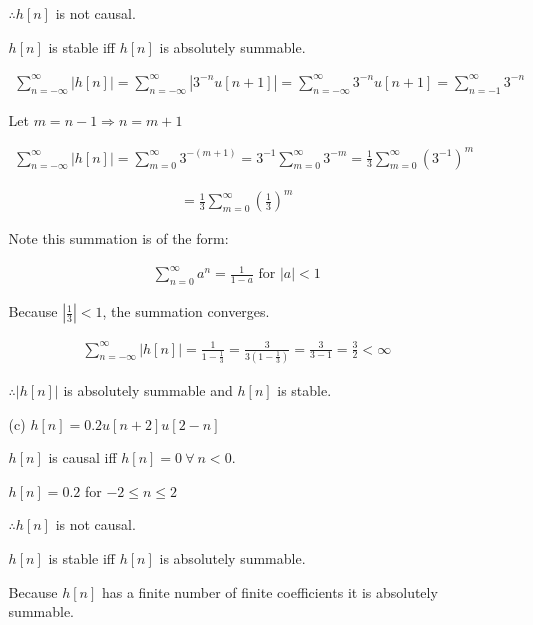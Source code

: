 \documentclass[fleqn]{article}
\begin{document}
\begin{enumerate}[nolistsep]
\begin{enumerate}[nolistsep]
					$\therefore h[n]$ is not causal.
					
					$h[n]$ is stable iff $h[n]$ is absolutely summable.
					
					\begin{align*}
						\sum_{n=-\infty}^{\infty}{|h[n]|} = \sum_{n=-\infty}^{\infty}{|3^{-n}u[n+1]|} = \sum_{n=-\infty}^{\infty}{3^{-n}u[n+1]} = \sum_{n=-1}^{\infty}{3^{-n}}
					\end{align*}
					
					Let $m = n - 1 \Rightarrow n = m + 1$
					
					\begin{align*}
						\sum_{n=-\infty}^{\infty}{|h[n]|} = \sum_{m=0}^{\infty}{3^{-(m+1)}} = 3^{-1}\sum_{m=0}^{\infty}{3^{-m}} = \frac{1}{3}\sum_{m=0}^{\infty}{(3^{-1})^{m}}
					\end{align*}
					
					\begin{align*}
						 = \frac{1}{3}\sum_{m=0}^{\infty}{\left(\frac{1}{3}\right)^{m}}
					\end{align*}
					
					Note this summation is of the form:
					
					\begin{align*}
						\sum_{n=0}^{\infty}{a^n} = \frac{1}{1-a} \text{ for } |a| < 1 
					\end{align*}
					
					Because $|\frac{1}{3}| < 1$, the summation converges.
					
					\begin{align*}
						\sum_{n=-\infty}^{\infty}{|h[n]|} = \frac{1}{1-\frac{1}{3}} = \frac{3}{3\left(1-\frac{1}{3}\right)} = \frac{3}{3 - 1} = \frac{3}{2} < \infty
					\end{align*}
					
					$\therefore |h[n]|$ is absolutely summable and $h[n]$ is stable.
					
				\item[(c)] $h[n] = 0.2u[n+2]u[2-n]$
				
					$h[n]$ is causal iff $h[n] = 0\ \forall\ n < 0$.
					
					$h[n] = 0.2$ for $-2 \leq n \leq 2$
					
					$\therefore h[n]$ is not causal.
					
					$h[n]$ is stable iff $h[n]$ is absolutely summable.
					
					Because $h[n]$ has a finite number of finite coefficients it is absolutely summable.
					

\end{enumerate}
\end{enumerate}
\end{document}
